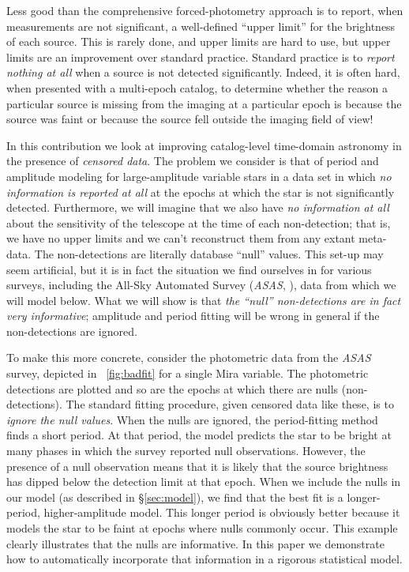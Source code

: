 \documentclass[12pt,preprint]{aastex}
\begin{document}
Less good than the comprehensive forced-photometry approach is to report, when measurements are not significant,
a well-defined ``upper limit'' for the brightness of each source.
This is rarely done, and upper limits are hard to use, but upper limits are an improvement over standard practice.
Standard practice is to \emph{report nothing at all} when a source is not detected significantly.
Indeed, it is often hard, when presented with a multi-epoch catalog,
to determine whether the reason a particular source is missing from the imaging at a particular epoch
is because the source was faint or because the source fell outside the imaging field of view!

In this contribution we look at improving catalog-level time-domain astronomy in the presence of \emph{censored data}.
The problem we consider is that of period and amplitude modeling for large-amplitude variable stars in a data set
in which \emph{no information is reported at all} at the epochs at which the star is not significantly detected.
Furthermore, we will imagine that we also have \emph{no information at all} about the sensitivity of the telescope
at the time of each non-detection; that is, we have no upper limits and we can't reconstruct them from any extant meta-data.
The non-detections are literally database ``null'' values.
This set-up may seem artificial, but it is in fact the situation we find ourselves in for various surveys,
including the All-Sky Automated Survey (\textsl{ASAS}, \citealt{2001ASPC..246...53P}), data from which we will model below.
What we will show is that \emph{the ``null'' non-detections are in fact very informative};
amplitude and period fitting will be wrong in general if the non-detections are ignored.

To make this more concrete, consider the photometric data from the \textsl{ASAS} survey,
depicted in \figurename~\ref{fig:badfit} for a single Mira variable.
The photometric detections are plotted and so are the epochs at which there are nulls (non-detections).
The standard fitting procedure, given censored data like these, is to \emph{ignore the null values}.
When the nulls are ignored, the period-fitting method finds a short period.
At that period, the model predicts the star to be bright at many phases in which the survey reported null observations.
However, the presence of a null observation means that it is likely that the source brightness has dipped below the detection limit at that epoch.
When we include the nulls in our model (as described in \S\ref{sec:model}), we find that the best fit is a longer-period, higher-amplitude model.
This longer period is obviously better because it models the star to be faint at epochs where nulls commonly occur.
This example clearly illustrates that the nulls are informative.
In this paper we demonstrate how to automatically incorporate that information in a rigorous statistical model.
\end{document}
